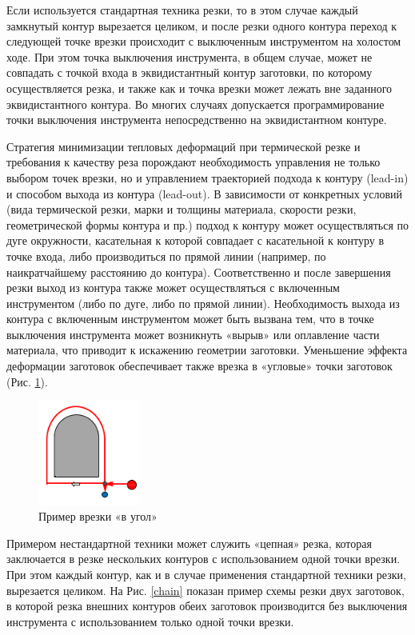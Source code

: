 \documentclass{article}
\begin{document}
Если используется стандартная техника резки,
то в этом случае каждый замкнутый контур вырезается целиком,
и после резки одного контура переход к следующей точке врезки
происходит с выключенным инструментом на холостом ходе.
При этом точка выключения инструмента, в общем случае,
может не совпадать с точкой входа в эквидистантный контур заготовки,
по которому осуществляется резка, и также как и точка врезки
может лежать вне заданного эквидистантного контура.
Во многих случаях допускается программирование точки выключения
инструмента непосредственно на эквидистантном контуре.

Стратегия минимизации тепловых деформаций при термической резке
и требования к качеству реза порождают необходимость управления
не только выбором точек врезки,
но и управлением траекторией подхода к контуру (lead-in)
и способом выхода из контура (lead-out).
В зависимости от конкретных условий
(вида термической резки, марки и толщины материала,
скорости резки, геометрической формы контура и пр.)
подход к контуру может осуществляться по дуге окружности,
касательная к которой совпадает с касательной к контуру в точке входа,
либо производиться по прямой линии
(например, по наикратчайшему расстоянию до контура).
Соответственно и после завершения резки выход из контура
также может осуществляться с включенным инструментом
(либо по дуге, либо по прямой линии).
Необходимость выхода из контура с включенным
инструментом может быть вызвана тем,
что в точке выключения инструмента может возникнуть
«вырыв» или оплавление части материала,
что приводит к искажению геометрии заготовки.
Уменьшение эффекта деформации заготовок обеспечивает
также врезка в «угловые» точки заготовок
(Рис. \ref{corner}).

\begin{figure}
  \begin{center}
  \includegraphics[width=0.3\textwidth]{corner.png}
  \caption{Пример врезки «в угол»}
  \label{corner}
  \end{center}
\end{figure}

Примером нестандартной техники
может служить «цепная» резка,
которая заключается в резке нескольких контуров с
использованием одной точки врезки.
При этом каждый контур,
как и в случае применения стандартной техники резки,
вырезается целиком.
На Рис. \ref{chain}
показан пример схемы резки двух заготовок,
в которой резка внешних контуров обеих заготовок
производится без выключения инструмента
с использованием только одной точки врезки.
\end{document}

